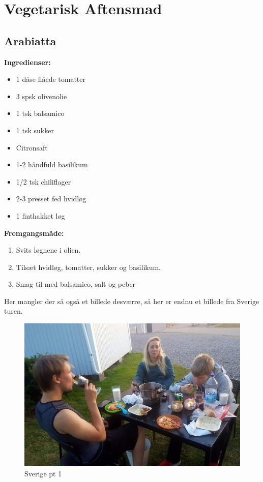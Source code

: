 \documentclass{book}
\begin{document}
\chapter{Vegetarisk Aftensmad}
\minitoc 
\newpage \section{Arabiatta}
\begin{minipage}[t]{0.5\textwidth}
\textbf{Ingredienser:}
\begin{itemize}
    \item 1 dåse flåede tomatter
    \item 3 spsk olivenolie
    \item 1 tsk balsamico
    \item 1 tsk sukker
    \item Citronsaft
    \item 1-2 håndfuld basilikum
    \item 1/2 tsk chiliflager 
    \item 2-3 presset fed hvidløg
    \item 1 finthakket løg
\end{itemize}
\end{minipage}
\begin{minipage}[t]{0.5\textwidth}
\textbf{Fremgangsmåde:}
\begin{enumerate}
    \item Svits løgnene i olien.
    \item Tilsæt hvidløg, tomatter, sukker og basilikum.
    \item Smag til med balsamico, salt og peber
\end{enumerate}
\end{minipage}
\newpage Her mangler der så også et billede desværre, så her er endnu et billede fra Sverige turen.
\begin{figure}
    \centering
    \includegraphics[width=0.5\linewidth]{Sverigept1.jpg}
    \caption{Sverige pt 1}
    
\end{figure}
\end{document}
